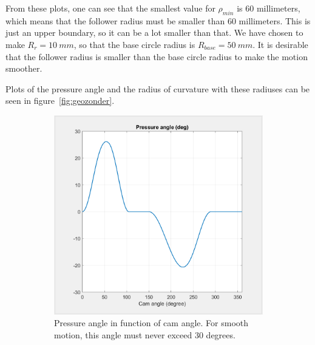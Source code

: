 \documentclass[a4paper]{article}
\begin{document}
From these plots, one can see that the smallest value for \(\rho_{min}\) is 60 millimeters, which means that the follower radius must be smaller than 60 millimeters. This is just an upper boundary, so it can be a lot smaller than that. We have chosen to make \textbf{\(R_r=10~mm\)}, so that the base circle radius is \textbf{\(R_{base}=50~mm\)}. It is desirable that the follower radius is smaller than the base circle radius to make the motion smoother.

Plots of the pressure angle and the radius of curvature with these radiuses can be seen in figure~\ref{fig:geozonder}.

\begin{figure}
	\centering
	
	\begin{subfigure}{.7\textwidth}
		\centering
		\label{alo}
		\includegraphics[width=\textwidth]{preszonder.png}
		\caption{Pressure angle in function of cam angle. For smooth motion, this angle must never exceed 30 degrees.}
	\end{subfigure}
	\hfill
	\begin{subfigure}{.7\textwidth}
		\centering
		\label{allo}

\end{subfigure}
\end{figure}
\end{document}
